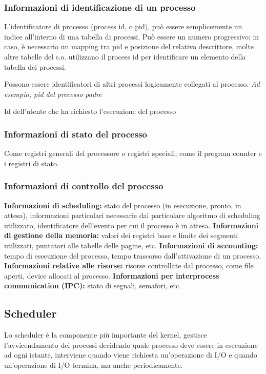\subsubsection{Informazioni di identificazione di un processo}
L'identificatore di processo (process id, o pid), può essere semplicemente un indice all'interno di una tabella di processi.
Può essere un numero progressivo; in caso, è necessario
un mapping tra pid e posizione del relativo descrittore, molte altre tabelle del s.o. utilizzano il process id per identificare un elemento della tabella dei processi.

Possono essere identificatori di altri processi logicamente collegati al processo. \textit{Ad esempio, pid del processo padre}

Id dell'utente che ha richiesto l'esecuzione del processo

\subsubsection{Informazioni di stato del processo}
Come registri generali del processore o registri speciali, come il program counter e i registri di stato.

\subsubsection{Informazioni di controllo del processo}
\textbf{Informazioni di scheduling:} stato del processo (in esecuzione, pronto, in attesa), informazioni particolari necessarie dal particolare algoritmo di scheduling utilizzato, identificatore dell'evento per cui il processo è in attesa.
\newline
\textbf{Informazioni di gestione della memoria:} valori dei registri base e limite dei segmenti utilizzati, puntatori alle tabelle delle pagine, etc.
\newline
\textbf{Informazioni di accounting:} tempo di esecuzione del processo, tempo trascorso dall'attivazione di un processo.
\newline
\textbf{Informazioni relative alle risorse:} risorse controllate dal processo, come file aperti, device allocati al processo.
\newline
\textbf{Informazioni per interprocess communication (IPC):} stato di segnali, semafori, etc.

\subsection{Scheduler}
Lo scheduler è la componente più importante del kernel, gestisce l'avvicendamento dei processi decidendo quale processo deve essere in esecuzione ad ogni istante, interviene quando viene richiesta un'operazione di I/O e quando un'operazione di I/O termina, ma anche periodicamente.

